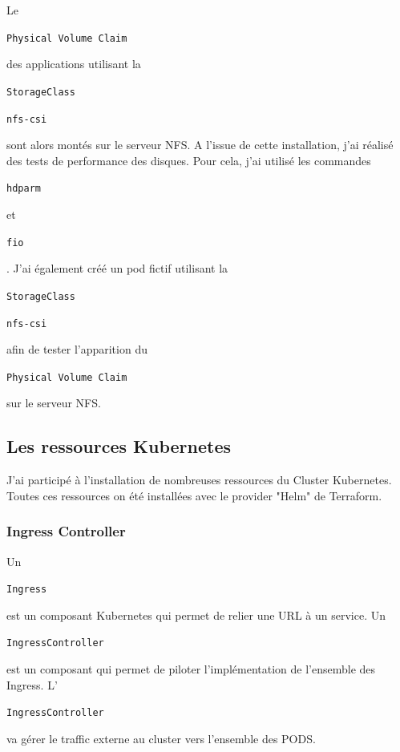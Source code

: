 \documentclass[12pt, a4paper, twoside]{article}
\begin{document}
Le \begin{code}\texttt{Physical Volume Claim}\end{code} des applications utilisant la \begin{code}\texttt{StorageClass}\end{code} \begin{code}\texttt{nfs-csi}\end{code} sont alors montés sur le serveur \gls{NFS}.
A l'issue de cette installation, j'ai réalisé des tests de performance des disques.
Pour cela, j'ai utilisé les commandes \begin{code}\texttt{hdparm}\end{code} et \begin{code}\texttt{fio}\end{code}.
J'ai également créé un pod fictif utilisant la \begin{code}\texttt{StorageClass}\end{code} \begin{code}\texttt{nfs-csi}\end{code} afin de tester l'apparition du \begin{code}\texttt{Physical Volume Claim}\end{code} sur le serveur \gls{NFS}.

\newpage
\subsection{Les ressources Kubernetes}
J'ai participé à l'installation de nombreuses ressources du Cluster \gls{Kubernetes}.
Toutes ces ressources on été installées avec le provider "Helm" de \gls{Terraform}.

\subsubsection{Ingress Controller}
Un \begin{code}\texttt{Ingress}\end{code} est un composant \gls{Kubernetes} qui permet de relier une URL à un service.
Un \begin{code}\texttt{IngressController}\end{code} est un composant qui permet de piloter l'implémentation de l'ensemble des Ingress.
L'\begin{code}\texttt{IngressController}\end{code} va gérer le traffic externe au \gls{cluster} vers l'ensemble des PODS.
\end{document}
